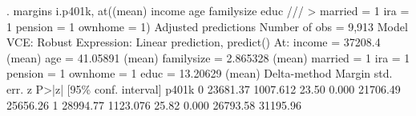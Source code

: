 . margins i.p401k, at((mean) income age familysize educ   ///
>         married = 1 ira = 1 pension = 1 ownhome = 1)
{\smallskip}
Adjusted predictions                                     Number of obs = 9,913
Model VCE: Robust
{\smallskip}
Expression: Linear prediction, predict()
At: income     =  37208.4 (mean)
    age        = 41.05891 (mean)
    familysize = 2.865328 (mean)
    married    =        1
    ira        =        1
    pension    =        1
    ownhome    =        1
    educ       = 13.20629 (mean)
{\smallskip}
             {\VBAR}            Delta-method
             {\VBAR}     Margin   std. err.      z    P>|z|     [95\% conf. interval]
       p401k {\VBAR}
          0  {\VBAR}   23681.37   1007.612    23.50   0.000     21706.49    25656.26
          1  {\VBAR}   28994.77   1123.076    25.82   0.000     26793.58    31195.96
